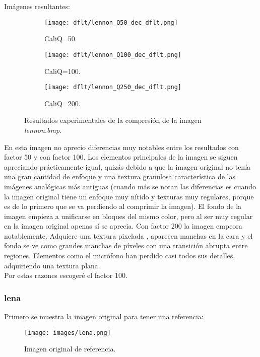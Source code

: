 \documentclass[12pt,a4paper]{article}
\begin{document}
Imágenes resultantes:
\begin{figure}   [H]   
    \begin{subfigure}{0.30\textwidth}
        \centering
        \texttt{[image: dflt/lennon\_Q50\_dec\_dflt.png]}
        \caption{CaliQ=50.}
        
    \end{subfigure}
    \hfill
    \begin{subfigure}{0.30\textwidth}
        \centering
        \texttt{[image: dflt/lennon\_Q100\_dec\_dflt.png]}
        \caption{CaliQ=100.}
        
    \end{subfigure}
    \hfill
    \begin{subfigure}{0.30\textwidth}
        \centering
        \texttt{[image: dflt/lennon\_Q250\_dec\_dflt.png]}
        \caption{CaliQ=200.}
        
    \end{subfigure}

    
    \caption[Resultados experimentales - lennon]{Resultados experimentales de la compresión de la imagen \textit{lennon.bmp}.}
    
\end{figure}

En esta imagen no aprecio diferencias muy notables entre los resultados con factor 50 y con factor 100. Los elementos principales de la imagen se siguen apreciando prácticamente igual, quizás debido a que la imagen original no tenía una gran cantidad de enfoque y una textura granulosa característica de las imágenes analógicas más antiguas (cuando más se notan las diferencias es cuando la imagen original tiene un enfoque muy nítido y texturas muy regulares, porque es de lo primero que se va perdiendo al comprimir la imagen). El fondo de la imagen empieza a unificarse en bloques del mismo color, pero al ser muy regular en la imagen original apenas sí se aprecia. Con factor 200 la imagen empeora notablemente. Adquiere una textura pixelada , aparecen manchas en la cara y el fondo se ve como grandes manchas de píxeles con una transición abrupta entre regiones. Elementos como el micrófono han perdido casi todos sus detalles, adquiriendo una textura plana.\\

Por estas razones escogeré el factor 100.


\subsubsection{lena}
Primero se muestra la imagen original para tener una referencia:
\begin{figure}[H]
    \centering
    \texttt{[image: images/lena.png]}
    \caption[Referencia - lena]{Imagen original de referencia.}
    
\end{figure}
    
\end{document}
